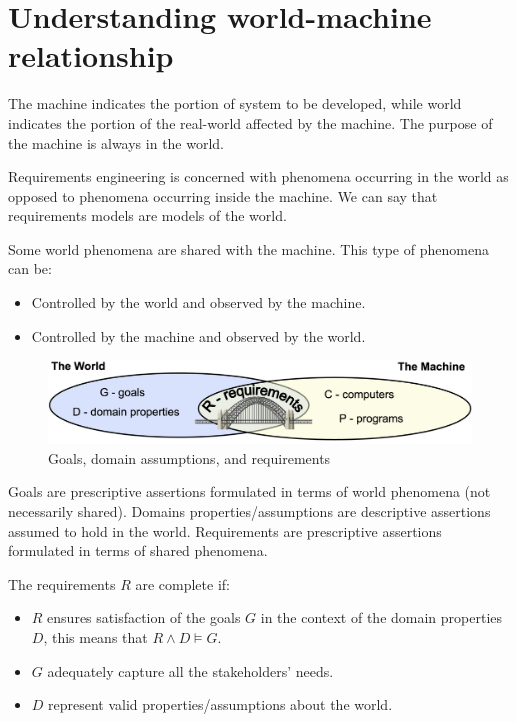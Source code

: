 \documentclass[12pt, a4paper]{report}
\theoremstyle{remark}
\begin{document}
\section{Understanding world-machine relationship}
    The machine indicates the portion of system to be developed, while world indicates the portion of the real-world affected by the machine. The purpose of the machine is always in the world. 
    \par
    Requirements engineering is concerned with phenomena occurring in the world as opposed to phenomena occurring inside the machine. We can say that requirements models are models of the world. 
    \par
    Some world phenomena are shared with the machine. This type of phenomena can be: 
    \begin{itemize}
        \item Controlled by the world and observed by the machine.
        \item Controlled by the machine and observed by the world.
    \end{itemize}
    \begin{figure}
        \centering
        \includegraphics[width=1\linewidth]{images/worldmachine.png}
        \caption{Goals, domain assumptions, and requirements}
    \end{figure}
    Goals are prescriptive assertions formulated in terms of world phenomena (not necessarily shared). Domains properties/assumptions are descriptive assertions assumed to hold in the world. Requirements are prescriptive assertions formulated in terms of shared phenomena. 
    \par 
    The requirements $R$ are complete if: 
    \begin{itemize}
        \item $R$ ensures satisfaction of the goals $G$ in the context of the domain properties $D$, this means that $R\land D \models G$.
        \item $G$ adequately capture all the stakeholders' needs.
        \item $D$ represent valid properties/assumptions about the world.
    \end{itemize}
\end{document}
